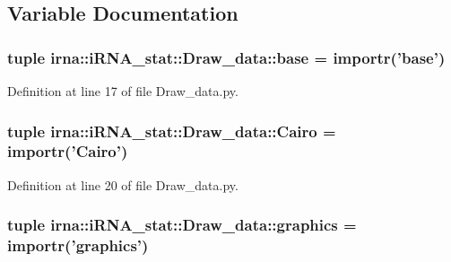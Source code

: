\subsection{\-Variable \-Documentation}
\hypertarget{namespaceirna_1_1iRNA__stat_1_1Draw__data_acedcfd6ea92994e69ece645a9ed2537b}{
\subsubsection[{base}]{\setlength{\rightskip}{0pt plus 5cm}tuple {\bf irna\-::i\-R\-N\-A\-\_\-stat\-::\-Draw\-\_\-data\-::base} = importr('{\bf base}')}}
\label{namespaceirna_1_1iRNA__stat_1_1Draw__data_acedcfd6ea92994e69ece645a9ed2537b}


\-Definition at line 17 of file \-Draw\-\_\-data.\-py.

\hypertarget{namespaceirna_1_1iRNA__stat_1_1Draw__data_a6ab40480025057ff930f9248fa8ef6cb}{
\subsubsection[{\-Cairo}]{\setlength{\rightskip}{0pt plus 5cm}tuple {\bf irna\-::i\-R\-N\-A\-\_\-stat\-::\-Draw\-\_\-data\-::\-Cairo} = importr('{\bf \-Cairo}')}}
\label{namespaceirna_1_1iRNA__stat_1_1Draw__data_a6ab40480025057ff930f9248fa8ef6cb}


\-Definition at line 20 of file \-Draw\-\_\-data.\-py.

\hypertarget{namespaceirna_1_1iRNA__stat_1_1Draw__data_a99616724d338476cea101489f2a9a42c}{
\subsubsection[{graphics}]{\setlength{\rightskip}{0pt plus 5cm}tuple {\bf irna\-::i\-R\-N\-A\-\_\-stat\-::\-Draw\-\_\-data\-::graphics} = importr('{\bf graphics}')}}
\label{namespaceirna_1_1iRNA__stat_1_1Draw__data_a99616724d338476cea101489f2a9a42c}


